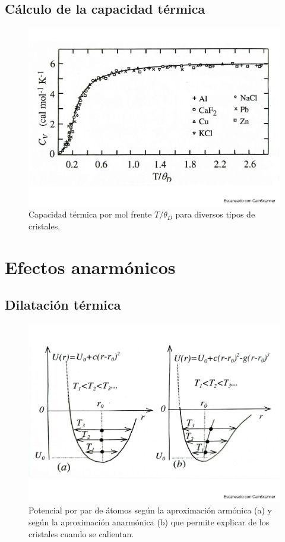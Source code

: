 \subsection{Cálculo de la capacidad térmica}

\begin{figure}[h!] \centering
    \includegraphics[scale=0.5]{Cuerpo/Ch_05/Fotos libro 4.pdf}
    \caption{Capacidad térmica por mol frente $T/\theta_D$ para diversos tipos de cristales.}
    \label{Fig:05-04}
\end{figure}    



\section{Efectos anarmónicos}

\subsection{Dilatación térmica}

\begin{figure}[h!] \centering
    \includegraphics[scale=0.5]{Cuerpo/Ch_05/Fotos libro 5.pdf}
    \caption{Potencial por par de átomos según la aproximación armónica (a) y según la aproximación anarmónica (b) que permite explicar de los cristales cuando se calientan.}
    \label{Fig:05-05}
\end{figure}    


